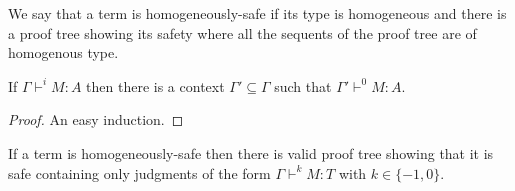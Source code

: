 We say that a term is homogeneously-safe if its type is homogeneous
and there is a proof tree showing its safety where all the sequents
of the proof tree are of homogenous type.

\begin{lem}
\label{lem:context_reduction} If $\Gamma \vdash^i M : A$ then there
is a context $\Gamma' \subseteq \Gamma$ such that $\Gamma' \vdash^0
M : A$.
\end{lem}
\begin{proof}
An easy induction.
\end{proof}


\begin{lem}
\label{lem:homog_judg_zero_minusone} If a term is homogeneously-safe
then there is valid proof tree showing that it is safe containing
only judgments of the form $\Gamma \vdash^{k} M : T$ with $k\in
\{-1,0\}$.
\end{lem}

